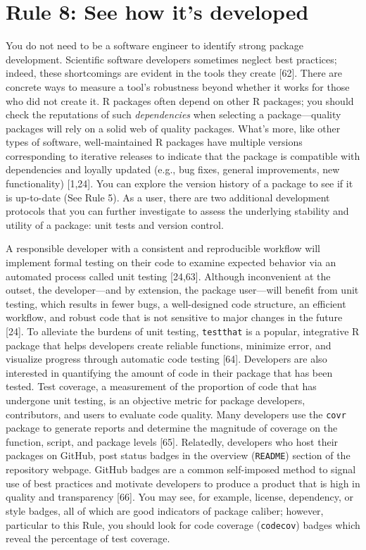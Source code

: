 \documentclass[10pt,letterpaper]{article}
\begin{document}
\hypertarget{rule-8-see-how-its-developed}{%
\section{Rule 8: See how it's
developed}\label{rule-8-see-how-its-developed}}

You do not need to be a software engineer to identify strong package
development. Scientific software developers sometimes neglect best
practices; indeed, these shortcomings are evident in the tools they
create {[}62{]}. There are concrete ways to measure a tool's robustness
beyond whether it works for those who did not create it. R packages
often depend on other R packages; you should check the reputations of
such \emph{dependencies} when selecting a package---quality packages
will rely on a solid web of quality packages. What's more, like other
types of software, well-maintained R packages have multiple versions
corresponding to iterative releases to indicate that the package is
compatible with dependencies and loyally updated (e.g., bug fixes,
general improvements, new functionality) {[}1,24{]}. You can explore the
version history of a package to see if it is up-to-date (See Rule 5). As
a user, there are two additional development protocols that you can
further investigate to assess the underlying stability and utility of a
package: unit tests and version control.

A responsible developer with a consistent and reproducible workflow will
implement formal testing on their code to examine expected behavior via
an automated process called unit testing {[}24,63{]}. Although
inconvenient at the outset, the developer---and by extension, the
package user---will benefit from unit testing, which results in fewer
bugs, a well-designed code structure, an efficient workflow, and robust
code that is not sensitive to major changes in the future {[}24{]}. To
alleviate the burdens of unit testing, \texttt{testthat} is a popular,
integrative R package that helps developers create reliable functions,
minimize error, and visualize progress through automatic code testing
{[}64{]}. Developers are also interested in quantifying the amount of
code in their package that has been tested. Test coverage, a measurement
of the proportion of code that has undergone unit testing, is an
objective metric for package developers, contributors, and users to
evaluate code quality. Many developers use the \texttt{covr} package to
generate reports and determine the magnitude of coverage on the
function, script, and package levels {[}65{]}. Relatedly, developers who
host their packages on GitHub, post status badges in the overview
(\texttt{README}) section of the repository webpage. GitHub badges are a
common self-imposed method to signal use of best practices and motivate
developers to produce a product that is high in quality and transparency
{[}66{]}. You may see, for example, license, dependency, or style
badges, all of which are good indicators of package caliber; however,
particular to this Rule, you should look for code coverage
(\texttt{codecov}) badges which reveal the percentage of test coverage.
\end{document}
